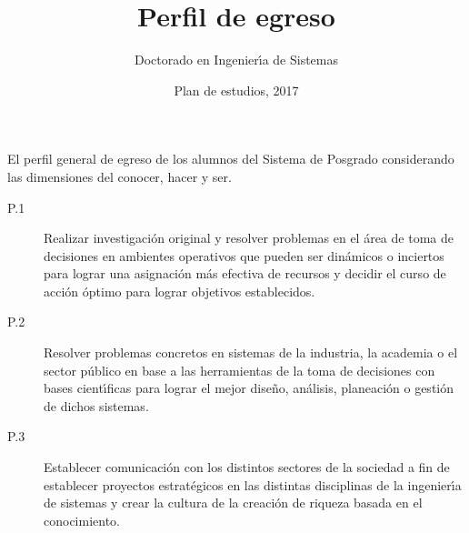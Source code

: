 \documentclass{article}
\title{Perfil de egreso}
\author{Doctorado en Ingenier\'{\i}a de Sistemas}
\date{Plan de estudios, 2017}
\begin{document}
\maketitle

El perfil general de egreso de los alumnos del Sistema de Posgrado
considerando las dimensiones del conocer, hacer y ser.

\begin{description}
\item[P.1]{Realizar investigaci\'{o}n original y resolver problemas en el
    \'{a}rea de toma de decisiones en ambientes operativos que pueden ser
    din\'{a}micos o inciertos para lograr una asignaci\'{o}n m\'{a}s efectiva de
    recursos y decidir el curso de acci\'{o}n \'{o}ptimo para lograr objetivos
    establecidos.}
\item[P.2]{Resolver problemas concretos en sistemas de la industria,
    la academia o el sector p\'{u}blico en base a las herramientas de la
    toma de decisiones con bases cient\'{\i}ficas para lograr el mejor
    dise\~{n}o, an\'{a}lisis, planeaci\'{o}n o gesti\'{o}n de dichos sistemas.}
\item[P.3]{Establecer comunicaci\'{o}n con los distintos sectores de la
    sociedad a fin de establecer proyectos estrat\'{e}gicos en las
    distintas disciplinas de la ingenier\'{\i}a de sistemas y crear la
    cultura de la creaci\'{o}n de riqueza basada en el conocimiento.}
\end{description}
  
\end{document}
